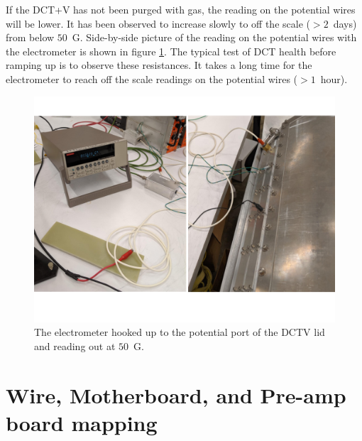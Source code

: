 \documentclass[12pt]{article}
\begin{document}
If the DCT+V has not been purged with gas, the reading on the potential wires will be lower. %
It has been observed to increase slowly to off the scale ($>2$~days) from below $50$~G\ohm. Side-by-side picture of the reading on the potential wires with the electrometer is shown in figure \ref{fig:electrometer}. The typical test of DCT health before ramping up is to observe these resistances. It takes a long time for the electrometer to reach off the scale readings on the potential wires ($>1$~hour). %

\begin{figure}
  \centering
  \includegraphics[scale=0.4]{DCT_keithley.png}
  \vspace{-0.4in}
  \caption{The electrometer hooked up to the potential port of the DCTV lid and reading out at $50$~G\ohm.}
  \label{fig:electrometer}
\end{figure} %
\section{Wire, Motherboard, and Pre-amp board mapping}
\end{document}
